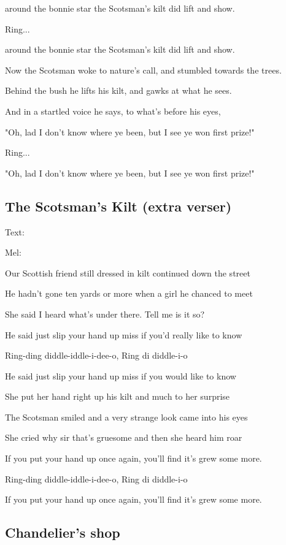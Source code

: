 around the bonnie star the Scotsman's kilt did lift and show.\bigskip

Ring...

around the bonnie star the Scotsman's kilt did lift and show. \bigskip


Now the Scotsman woke to nature's call, and stumbled towards the trees.

Behind the bush he lifts his kilt, and gawks at what he sees.

And in a startled voice he says, to what's before his eyes,

"Oh, lad I don't know where ye been, but I see ye won first prize!"\bigskip

Ring...

"Oh, lad I don't know where ye been, but I see ye won first prize!" \bigskip

\subsection{\textbf{The Scotsman's Kilt (extra verser)}}

Text: 

Mel: \bigskip

Our Scottish friend still dressed in kilt continued down the street

He hadn't gone ten yards or more when a girl he chanced to meet

She said I heard what's under there. Tell me is it so?

He said just slip your hand up miss if you'd really like to know\bigskip

Ring-ding diddle-iddle-i-dee-o, Ring di diddle-i-o

He said just slip your hand up miss if you would like to know\bigskip

She put her hand right up his kilt and much to her surprise

The Scotsman smiled and a very strange look came into his eyes

She cried why sir that’s gruesome and then she heard him roar

If you put your hand up once again, you'll find it's grew some more.\bigskip

Ring-ding diddle-iddle-i-dee-o, Ring di diddle-i-o

If you put your hand up once again, you'll find it's grew some more.\bigskip

\subsection{\textbf{Chandelier's shop}}

